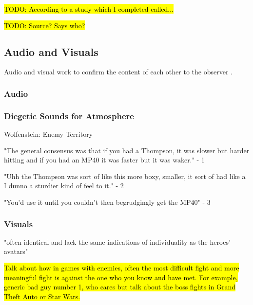 \documentclass{article}
\begin{document}
\hl{TODO: According to a study which I completed called... }

\hl{TODO: Source? Says who?}

\subsection{Audio and Visuals}

Audio and visual work to confirm the content of each other to the observer \cite{diegeticSounds1}. 

\subsubsection{Audio}

\subsubsection{Diegetic Sounds for Atmosphere}

 \cite{diegeticSounds1}



Wolfenstein: Enemy Territory


"The general consensus was that if you had a Thompson, it was slower but harder hitting and if you had an MP40 it was faster but it was waker." - 1

"Uhh the Thompson was sort of like this more boxy, smaller, it sort of had like a I dunno a sturdier kind of feel to it." - 2

"You'd use it until you couldn't then begrudgingly get the MP40" - 3

\subsubsection{Visuals}

"often identical and lack the same indications of individuality as
the heroes’ avatars"

\hl{Talk about how in games with enemies, often the most difficult fight and more meaningful fight is against the one who you know and have met.
For example, generic bad guy number 1, who cares but talk about the boss fights in Grand Theft Auto or Star Wars.}
\end{document}
